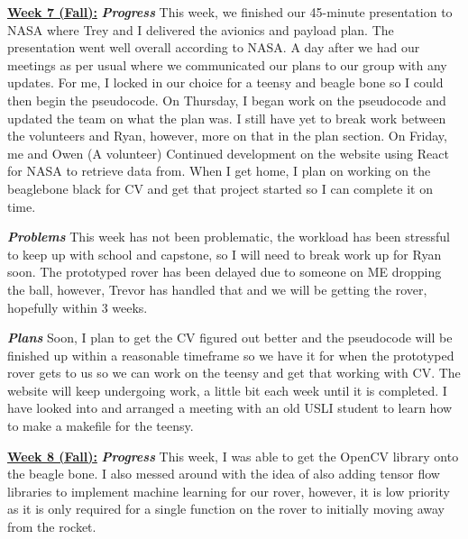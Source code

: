 \documentclass[onecolumn, draftclsnofoot, 10pt, compsoc]{IEEEtran}
\begin{document}
\underline{\textbf{Week 7 (Fall):}}
\newline\textbf{\textit{{Progress}}}
\newline 
This week, we finished our 45-minute presentation to NASA where Trey and I delivered the avionics and payload plan. The presentation went well overall according to NASA. A day after we had our meetings as per usual where we communicated our plans to our group with any updates. For me, I locked in our choice for a teensy and beagle bone so I could then begin the pseudocode. On Thursday, I began work on the pseudocode and updated the team on what the plan was. I still have yet to break work between the volunteers and Ryan, however, more on that in the plan section. On Friday, me and Owen (A volunteer) Continued development on the website using React for NASA to retrieve data from. When I get home, I plan on working on the beaglebone black for CV and get that project started so I can complete it on time. 
\newline 

\textbf{\textit{{Problems}}}
\newline 
This week has not been problematic, the workload has been stressful to keep up with school and capstone, so I will need to break work up for Ryan soon. The prototyped rover has been delayed due to someone on ME dropping the ball, however, Trevor has handled that and we will be getting the rover, hopefully within 3 weeks.
\newline 

\textbf{\textit{{Plans}}}
\newline 
Soon, I plan to get the CV figured out better and the pseudocode will be finished up within a reasonable timeframe so we have it for when the prototyped rover gets to us so we can work on the teensy and get that working with CV. The website will keep undergoing work, a little bit each week until it is completed. I have looked into and arranged a meeting with an old USLI student to learn how to make a makefile for the teensy.
\newline 

\underline{\textbf{Week 8 (Fall):}}
\newline\textbf{\textit{{Progress}}}
\newline 
This week, I was able to get the OpenCV library onto the beagle bone. I also messed around with the idea of also adding tensor flow libraries to implement machine learning for our rover, however, it is low priority as it is only required for a single function on the rover to initially moving away from the rocket. 
\newline 
\end{document}
